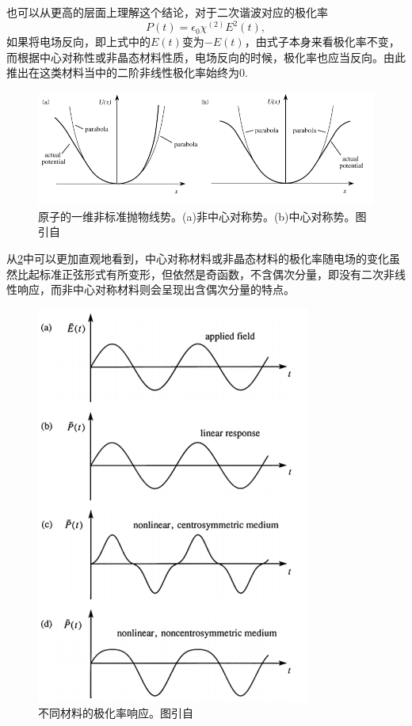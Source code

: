 \documentclass[UTF8,a4paper,cs4size,hyperref]{ctexart}
\begin{document}
也可以从更高的层面上理解这个结论，对于二次谐波对应的极化率
\begin{equation}
P(t) = \epsilon_0\chi^{(2)}E^2(t),
\end{equation}
如果将电场反向，即上式中的$E(t)$变为$-E(t)$，由式子本身来看极化率不变，而根据中心对称性或非晶态材料性质，电场反向的时候，极化率也应当反向。由此推出在这类材料当中的二阶非线性极化率始终为0.

\begin{figure}
\centering
\includegraphics[scale=0.6 ]{potential.png}
\caption{原子的一维非标准抛物线势。(a)非中心对称势。(b)中心对称势。图引自\cite{boyd2003nonlinear}}
\label{pic:potential}
\end{figure}

从\ref{pic:response}中可以更加直观地看到，中心对称材料或非晶态材料的极化率随电场的变化虽然比起标准正弦形式有所变形，但依然是奇函数，不含偶次分量，即没有二次非线性响应，而非中心对称材料则会呈现出含偶次分量的特点。

\begin{figure}
\centering
\includegraphics[scale=1 ]{response.png}
\caption{不同材料的极化率响应。图引自\cite{boyd2003nonlinear}}
\label{pic:response}
\end{figure}
\end{document}
